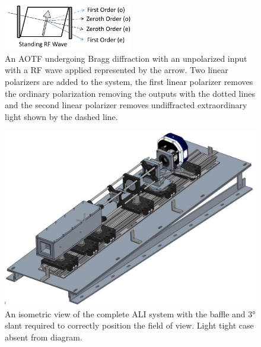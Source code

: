 \documentclass[12pt]{article}
\begin{document}
\begin{figure}
    \begin{center}
    \includegraphics[width=0.5\textwidth]{./Images/3-1-AOTFWithPolarizers.pdf}
    \caption{An AOTF undergoing Bragg diffraction with an unpolarized input with a RF wave applied represented by the arrow. Two linear polarizers are added to the system, the first linear polarizer removes the ordinary polarization removing the outputs with the dotted lines and the second linear polarizer removes undiffracted extraordinary light shown by the dashed line.}
    \label{fig:3.1:ATOFLayoutWithPolarizers}
    \end{center}
\end{figure}

\clearpage

\begin{figure}
        \centering
        \includegraphics[width=1.0\textwidth]{./Images/3-3-AliCompleteDesign.pdf}
        \caption{An isometric view of the complete ALI system with the baffle and 3\si{\degree} slant required to correctly position the field of view. Light tight case absent
from diagram.}
        \label{fig:3.3:aliSystemDiagram}
\end{figure}

\clearpage
\end{document}
